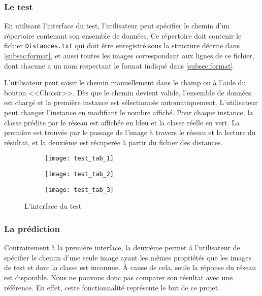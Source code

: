 \subsubsection{Le test}

En utilisant l'interface du test, l'utilisateur peut spécifier le chemin d'un
répertoire contenant son ensemble de données. Ce répertoire doit contenir le fichier
\texttt{Distances.txt} qui doit être enregistré sous la structure décrite dans
\ref{subsec:format}, et aussi toutes les images correspondant
aux lignes de ce fichier, dont chacune a un nom respectant le format indiqué dans \ref{subsec:format}.

L'utilisateur peut saisir le chemin manuellement dans le champ ou à l'aide du bouton
<<Choisir>>. Dès que le chemin devient valide, l'ensemble de données est chargé
et la première instance est sélectionnée automatiquement. L'utilisateur peut
changer l'instance en modifiant le nombre affiché. Pour chaque instance, la classe
prédite par le réseau est affichée en bleu et la classe réelle en vert. La première
est trouvée par le passage de l'image à travers le réseau et la lecture du résultat,
et la deuxième est récuperée à partir du fichier des distances.

\parbox[][1em][]{\textwidth}{}

\begin{figure}[h]
\centering
\begin{subfigure}{0.32\textwidth}
  \texttt{[image: test\_tab\_1]}
\end{subfigure}
\begin{subfigure}{0.32\textwidth}
  \texttt{[image: test\_tab\_2]}
\end{subfigure}
\begin{subfigure}{0.32\textwidth}
  \texttt{[image: test\_tab\_3]}
\end{subfigure}
\caption{L'interface du test}
\end{figure}

\subsubsection{La prédiction}

Contrairement à la première interface, la deuxième permet à l'utilisateur de
spécifier le chemin d'une seule image ayant les mêmes propriétés que les images
de test et dont la classe est inconnue. \`A cause de cela, seule la réponse
du réseau est disponible. Nous ne pouvons donc pas comparer son résultat avec
une référence. En effet, cette fonctionnalité représente le but de ce projet.

